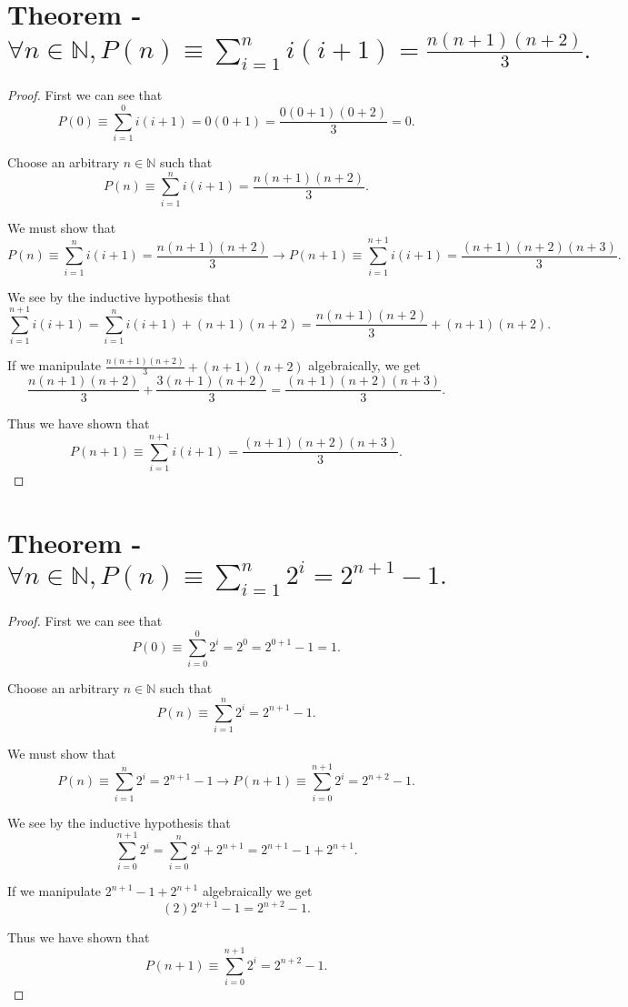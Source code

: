 \documentclass[11pt]{article}
\begin{document}
\section{Theorem - $\forall n\in \mathbb{N}, P(n)\equiv\sum_{i=1}^{n}i(i+1)=\frac{n(n+1)(n+2)}{3}.$}
\begin{proof}

First we can see that $$P(0)\equiv\sum_{i=1}^{0}i(i+1)=0(0+1)=\frac{0(0+1)(0+2)}{3}=0.$$

Choose an arbitrary $n\in \mathbb{N}$ such that $$P(n)\equiv\sum_{i=1}^{n}i(i+1)=\frac{n(n+1)(n+2)}{3}.$$

We must show that $$P(n)\equiv \sum_{i=1}^{n}i(i+1)=\frac{n(n+1)(n+2)}{3}\longrightarrow P(n+1)\equiv\sum_{i=1}^{n+1}i(i+1)=\frac{(n+1)(n+2)(n+3)}{3}.$$

We see by the inductive hypothesis that $$\sum_{i=1}^{n+1}i(i+1)=\sum_{i=1}^{n}i(i+1)+(n+1)(n+2)=\frac{n(n+1)(n+2)}{3}+(n+1)(n+2).$$

If we manipulate $\frac{n(n+1)(n+2)}{3}+(n+1)(n+2)$ algebraically, we get $$\frac{n(n+1)(n+2)}{3}+\frac{3(n+1)(n+2)}{3}=\frac{(n+1)(n+2)(n+3)}{3}.$$

Thus we have shown that $$P(n+1)\equiv\sum_{i=1}^{n+1}i(i+1)=\frac{(n+1)(n+2)(n+3)}{3}.$$

\end{proof}

\section{Theorem - $\forall n\in \mathbb{N}, P(n)\equiv\sum_{i=1}^{n} 2^{i}=2^{n+1}-1.$}
\begin{proof}
First we can see that $$P(0)\equiv\sum_{i=0}^{0}2^{i}=2^{0}=2^{0+1}-1=1.$$

Choose an arbitrary $n\in\mathbb{N}$ such that $$P(n)\equiv\sum_{i=1}^{n} 2^{i}=2^{n+1}-1.$$

We must show that $$P(n)\equiv\sum_{i=1}^{n} 2^{i}=2^{n+1}-1\longrightarrow P(n+1)\equiv\sum_{i=0}^{n+1}2^{i}=2^{n+2}-1.$$

We see by the inductive hypothesis that $$\sum_{i=0}^{n+1}2^{i}=\sum_{i=0}^{n}2^{i}+2^{n+1}=2^{n+1}-1+2^{n+1}.$$

If we manipulate $2^{n+1}-1+2^{n+1}$ algebraically we get $$(2)2^{n+1}-1=2^{n+2}-1.$$

 Thus we have shown that $$P(n+1)\equiv\sum_{i=0}^{n+1}2^{i}=2^{n+2}-1.$$
\end{proof}
\end{document}
